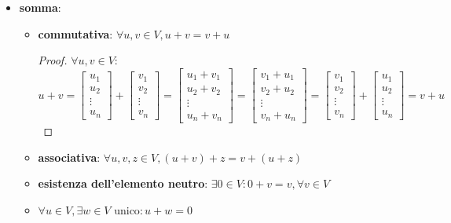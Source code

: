 \begin{itemize}
    \item \textbf{somma}:
    \begin{itemize}
        \item \textbf{commutativa}: $\forall u,v \in V, u+v = v+u$
        \begin{proof}
            $\forall u,v \in V:$
            $$ u+v = \left[\begin{array}{c}
                u_1\\u_2\\ \vdots \\u_n
            \end{array}\right] + \left[\begin{array}{c}
                v_1\\v_2\\\vdots\\v_n
            \end{array}\right] = \left[\begin{array}{c}
                u_1 + v_1\\u_2 + v_2\\\vdots\\u_n+v_n
            \end{array}\right] = \left[\begin{array}{c}
                v_1 + u_1\\v_2 + u_2\\\vdots\\v_n+u_n
            \end{array}\right] = \left[\begin{array}{c}
                v_1\\v_2\\\vdots\\v_n
            \end{array}\right] + \left[\begin{array}{c}
                u_1\\u_2 \\\vdots\\u_n
            \end{array}\right] = v+ u$$
        \end{proof}
        \item \textbf{associativa}: $\forall u,v,z \in V, (u+v)+z = v+(u+z)$
        \item \textbf{esistenza dell'elemento neutro}: $\exists 0 \in V: 0+v = v, \forall v\in V$
        \item $\forall u \in V, \exists w\in V \text{ unico}: u+w=0$

\end{itemize}
\end{itemize}
